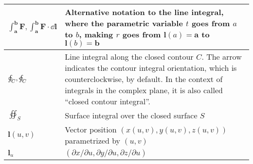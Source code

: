 \documentclass{article}
\begin{document}
\begin{xltabular}{\textwidth}{XX}
	\(\int_\mathbf{a}^\mathbf{b} \mathbf{F}, \int_\mathbf{a}^\mathbf{b} \mathbf{F}\cdot\dd{\mathbf{l}}\)                                                                                                                                       & Alternative notation to the line integral, where the parametric variable \(t\) goes from \(a\) to \(b\), making \(r\) goes from \(\mathbf{l}(a) = \mathbf{a}\) to \(\mathbf{l}(b) = \mathbf{b}\) \cite{apostolCalculus2ndEdn1967}                                                                                                   \\ \hline
	\(\oint_C, \varointctrclockwise_C\)                                                                                                                                                                                                        & Line integral along the closed contour \(C\). The arrow indicates the contour integral orientation, which is counterclockwise, by default. In the context of integrals in the complex plane, it is also called ``closed contour integral''.                                                                                         \\ \hline
	\(\oiint_S\)                                                                                                                                                                                                                               & Surface integral over the closed surface \(S\)                                                                                                                                                                                                                                                                                      \\ \hline
	\(\mathbf{l}(u,v)\)                                                                                                                                                                                                                        & Vector position \((x(u,v), y(u,v), z(u,v))\) parametrized by \((u,v)\)                                                                                                                                                                                                                                                              \\ \hline
	\(\mathbf{l}_u\)                                                                                                                                                                                                                           & \((\partial x/ \partial u, \partial y/ \partial u, \partial z/ \partial u)\)                                                                                                                                                                                                                                                        \\ \hline

\end{xltabular}
\end{document}
